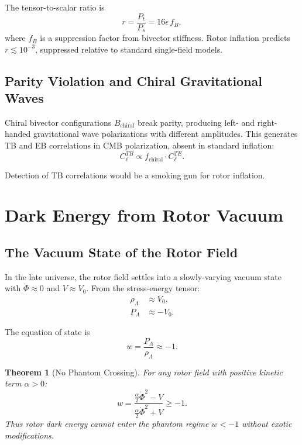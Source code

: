 \documentclass[11pt,a4paper]{article}
\numberwithin{equation}{section}
\theoremstyle{plain}
\newtheorem{theorem}{Theorem}[section]
\theoremstyle{definition}
\theoremstyle{remark}
\begin{document}
The tensor-to-scalar ratio is
\begin{equation}
r = \frac{P_t}{P_s} = 16\epsilon\, f_B,
\label{eq:tensor-ratio}
\end{equation}
where $f_B$ is a suppression factor from bivector stiffness. Rotor inflation predicts $r \lesssim 10^{-3}$, suppressed relative to standard single-field models.

\subsection{Parity Violation and Chiral Gravitational Waves}

Chiral bivector configurations $B_{\mathrm{chiral}}$ break parity, producing left- and right-handed gravitational wave polarizations with different amplitudes. This generates TB and EB correlations in CMB polarization, absent in standard inflation:
\begin{equation}
C_\ell^{TB} \propto f_{\mathrm{chiral}} \cdot C_\ell^{TE}.
\end{equation}

Detection of TB correlations would be a smoking gun for rotor inflation.

\section{Dark Energy from Rotor Vacuum}
\label{sec:dark-energy}

\subsection{The Vacuum State of the Rotor Field}

In the late universe, the rotor field settles into a slowly-varying vacuum state with $\dot{\Phi} \approx 0$ and $V \approx V_0$. From the stress-energy tensor:
\begin{align}
\rho_{\Lambda} &\approx V_0,\\
P_{\Lambda} &\approx -V_0.
\end{align}

The equation of state is
\begin{equation}
w = \frac{P_{\Lambda}}{\rho_{\Lambda}} \approx -1.
\label{eq:de-eos}
\end{equation}

\begin{theorem}[No Phantom Crossing]
For any rotor field with positive kinetic term $\alpha > 0$:
\begin{equation}
w = \frac{\frac{\alpha}{2}\dot{\Phi}^2 - V}{\frac{\alpha}{2}\dot{\Phi}^2 + V} \geq -1.
\end{equation}
Thus rotor dark energy cannot enter the phantom regime $w < -1$ without exotic modifications.
\end{theorem}
\end{document}
